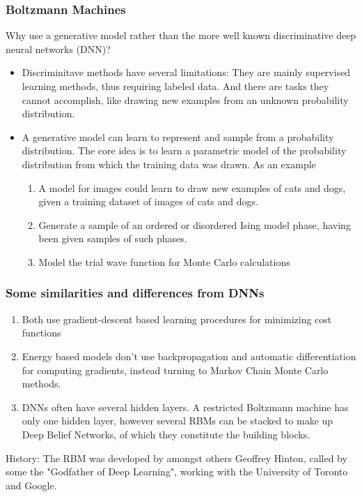 \documentclass{beamer}
\begin{document}
\begin{frame}
\frametitle{Boltzmann Machines}

Why use a generative model rather than the more well known discriminative deep neural networks (DNN)? 

\begin{itemize}
\item Discriminitave methods have several limitations: They are mainly supervised learning methods, thus requiring labeled data. And there are tasks they cannot accomplish, like drawing new examples from an unknown probability distribution.

\item A generative model can learn to represent and sample from a probability distribution. The core idea is to learn a parametric model of the probability distribution from which the training data was drawn. As an example
\begin{enumerate}

 \item A model for images could learn to draw new examples of cats and dogs, given a training dataset of images of cats and dogs.

 \item Generate a sample of an ordered or disordered Ising model phase, having been given samples of such phases.

 \item Model the trial wave function for Monte Carlo calculations
\end{enumerate}

\noindent
\end{itemize}

\noindent
\end{frame}

\begin{frame}
\frametitle{Some similarities and differences from DNNs}

\begin{enumerate}
\item Both use gradient-descent based learning procedures for minimizing cost functions

\item Energy based models don't use backpropagation and automatic differentiation for computing gradients, instead turning to Markov Chain Monte Carlo methods.

\item DNNs often have several hidden layers. A restricted Boltzmann machine has only one hidden layer, however several RBMs can be stacked to make up Deep Belief Networks, of which they constitute the building blocks.
\end{enumerate}

\noindent
History: The RBM was developed by amongst others Geoffrey Hinton, called by some the "Godfather of Deep Learning", working with the University of Toronto and Google.
\end{frame}
\end{document}
